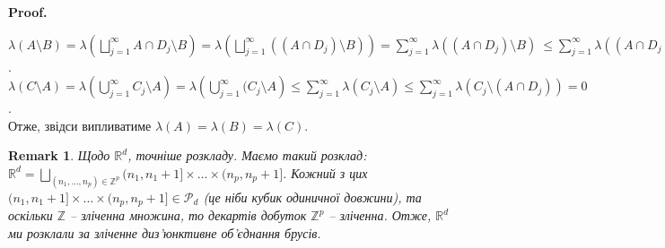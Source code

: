 \documentclass[a4paper, 10pt]{article}
\makeatletter
\theoremstyle{theoremdd}
\newtheorem{remark}[theorem]{Remark}
\renewenvironment{proof}[1][Proof.\\]{\par
\pushQED{\hfill \qed}%
\normalfont \topsep6\p@\@plus6\p@\relax
\trivlist
\item\relax
{\bfseries
#1\@addpunct{.}}\hspace\labelsep\ignorespaces
}{%
\popQED\endtrivlist\@endpefalse
}
\makeatother
\begin{document}
\begin{proof}
$\lambda(A \setminus B) = \displaystyle \lambda\left( \bigsqcup_{j=1}^\infty A \cap D_j \setminus B \right) = \lambda\left( \bigsqcup_{j=1}^\infty ((A \cap D_j) \setminus B) \right) = \sum_{j=1}^\infty \lambda((A \cap D_j) \setminus B) ~{\leq \sum_{j=1}^\infty \lambda((A \cap D_j) \setminus B_j) = 0}$.\\
$\lambda(C \setminus A) = \displaystyle\lambda\left( \bigcup_{j=1}^\infty C_j \setminus A\right) = \lambda\left( \bigcup_{j=1}^\infty (C_j \setminus A\right) \leq \sum_{j=1}^\infty \lambda(C_j \setminus A) \leq \sum_{j=1}^\infty \lambda(C_j \setminus (A \cap D_j)) = 0$.\\
Отже, звідси випливатиме $\lambda(A) = \lambda(B) = \lambda(C)$.
\end{proof}

\begin{remark}
Щодо $\mathbb{R}^d$, точніше розкладу. Маємо такий розклад: $\mathbb{R}^d = \displaystyle\bigsqcup_{(n_1,\dots,n_p) \in \mathbb{Z}^p} (n_1,n_1+1] \times \dots \times (n_p,n_p+1]$. Кожний з цих $(n_1,n_1+1] \times \dots \times (n_p,n_p+1] \in \mathcal{P}_d$ (це ніби кубик одиничної довжини), та оскільки $\mathbb{Z}$ -- зліченна множина, то декартів добуток $\mathbb{Z}^p$ -- зліченна. Отже, $\mathbb{R}^d$ ми розклали за зліченне диз'юнктивне об'єднання брусів.
\end{remark}

\newpage
\end{document}
